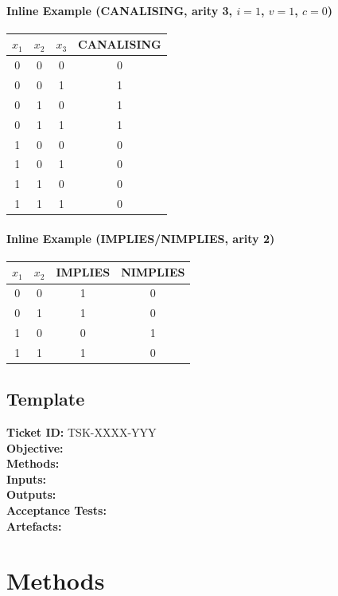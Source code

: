 \documentclass{article}
\begin{document}
\paragraph{Inline Example (CANALISING, arity 3, $i=1$, $v=1$, $c=0$)}
\begin{center}
\begin{tabular}{ccc|c}
\toprule
$x_1$ & $x_2$ & $x_3$ & CANALISING \\
\midrule
0 & 0 & 0 & 0 \\
0 & 0 & 1 & 1 \\
0 & 1 & 0 & 1 \\
0 & 1 & 1 & 1 \\
1 & 0 & 0 & 0 \\
1 & 0 & 1 & 0 \\
1 & 1 & 0 & 0 \\
1 & 1 & 1 & 0 \\
\bottomrule
\end{tabular}
\end{center}
\paragraph{Inline Example (IMPLIES/NIMPLIES, arity 2)}
\begin{center}
\begin{tabular}{cc|cc}
\toprule
$x_1$ & $x_2$ & IMPLIES & NIMPLIES \\
\midrule
0 & 0 & 1 & 0 \\
0 & 1 & 1 & 0 \\
1 & 0 & 0 & 1 \\
1 & 1 & 1 & 0 \\
\bottomrule
\end{tabular}
\end{center}
\subsection*{Template}
\textbf{Ticket ID:} TSK-XXXX-YYY\\
\textbf{Objective:}\\
\textbf{Methods:}\\
\textbf{Inputs:}\\
\textbf{Outputs:}\\
\textbf{Acceptance Tests:}\\
\textbf{Artefacts:}\\
\section{Methods}
\end{document}
